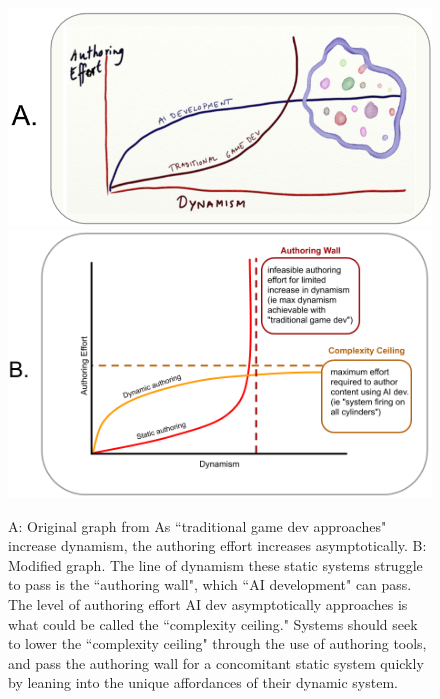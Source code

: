 \begin{figure}
    \centering
    \includegraphics[width=\textwidth]{figures/1A.png}
    \includegraphics[width=\textwidth]{figures/1B.png}
    \caption{A: Original graph from \cite{mateas2012artificial} As ``traditional game dev approaches" increase dynamism, the authoring effort increases asymptotically. \newline B: Modified graph. The line of dynamism these static systems struggle to pass is the ``authoring wall", which ``AI development" can pass. The level of authoring effort AI dev asymptotically approaches is what could be called the ``complexity ceiling." Systems should seek to lower the ``complexity ceiling" through the use of authoring tools, and pass the authoring wall for a concomitant static system quickly by leaning into the unique affordances of their dynamic system.}
    \label{fig:authoringWall1}
\end{figure}



